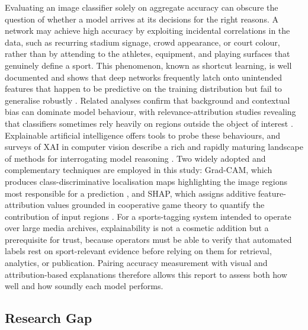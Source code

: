 Evaluating an image classifier solely on aggregate accuracy can obscure the question of whether a model arrives at its decisions for the right reasons.
A network may achieve high accuracy by exploiting incidental correlations in the data, such as recurring stadium signage, crowd appearance, or court colour, rather than by attending to the athletes, equipment, and playing surfaces that genuinely define a sport.
This phenomenon, known as shortcut learning, is well documented and shows that deep networks frequently latch onto unintended features that happen to be predictive on the training distribution but fail to generalise robustly \citep{geirhos2020shortcut}.
Related analyses confirm that background and contextual bias can dominate model behaviour, with relevance-attribution studies revealing that classifiers sometimes rely heavily on regions outside the object of interest \citep{bassi2024lrp}.
Explainable artificial intelligence offers tools to probe these behaviours, and surveys of XAI in computer vision describe a rich and rapidly maturing landscape of methods for interrogating model reasoning \citep{nguyen2025xaicv}.
Two widely adopted and complementary techniques are employed in this study: Grad-CAM, which produces class-discriminative localisation maps highlighting the image regions most responsible for a prediction \citep{selvaraju2017gradcam}, and SHAP, which assigns additive feature-attribution values grounded in cooperative game theory to quantify the contribution of input regions \citep{lundberg2017shap}.
For a sports-tagging system intended to operate over large media archives, explainability is not a cosmetic addition but a prerequisite for trust, because operators must be able to verify that automated labels rest on sport-relevant evidence before relying on them for retrieval, analytics, or publication.
Pairing accuracy measurement with visual and attribution-based explanations therefore allows this report to assess both how well and how soundly each model performs.

\subsection{Research Gap}
\label{sec:intro-gap}

